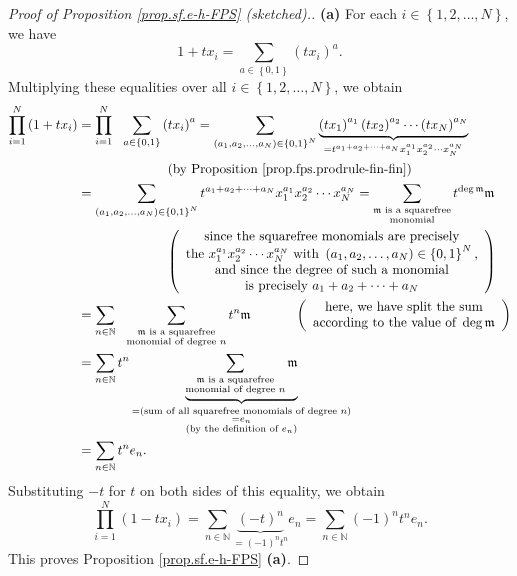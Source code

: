 \begin{proof}
[Proof of Proposition \ref{prop.sf.e-h-FPS} (sketched).]\textbf{(a)} For each
$i\in\left\{  1,2,\ldots,N\right\}  $, we have%
\[
1+tx_{i}=\sum_{a\in\left\{  0,1\right\}  }\left(  tx_{i}\right)  ^{a}.
\]
Multiplying these equalities over all $i\in\left\{  1,2,\ldots,N\right\}  $,
we obtain%
\begin{align*}
\prod_{i=1}^{N}\left(  1+tx_{i}\right)   &  =\prod_{i=1}^{N}\ \ \sum
_{a\in\left\{  0,1\right\}  }\left(  tx_{i}\right)  ^{a}=\sum_{\left(
a_{1},a_{2},\ldots,a_{N}\right)  \in\left\{  0,1\right\}  ^{N}}%
\underbrace{\left(  tx_{1}\right)  ^{a_{1}}\left(  tx_{2}\right)  ^{a_{2}%
}\cdots\left(  tx_{N}\right)  ^{a_{N}}}_{=t^{a_{1}+a_{2}+\cdots+a_{N}}%
x_{1}^{a_{1}}x_{2}^{a_{2}}\cdots x_{N}^{a_{N}}}\\
&  \ \ \ \ \ \ \ \ \ \ \ \ \ \ \ \ \ \ \ \ \left(  \text{by Proposition
\ref{prop.fps.prodrule-fin-fin}}\right) \\
&  =\sum_{\left(  a_{1},a_{2},\ldots,a_{N}\right)  \in\left\{  0,1\right\}
^{N}}t^{a_{1}+a_{2}+\cdots+a_{N}}x_{1}^{a_{1}}x_{2}^{a_{2}}\cdots x_{N}%
^{a_{N}}=\sum_{\substack{\mathfrak{m}\text{ is a squarefree}\\\text{monomial}%
}}t^{\deg\mathfrak{m}}\mathfrak{m}\\
&  \ \ \ \ \ \ \ \ \ \ \ \ \ \ \ \ \ \ \ \ \left(
\begin{array}
[c]{c}%
\text{since the squarefree monomials are precisely}\\
\text{the }x_{1}^{a_{1}}x_{2}^{a_{2}}\cdots x_{N}^{a_{N}}\text{ with }\left(
a_{1},a_{2},\ldots,a_{N}\right)  \in\left\{  0,1\right\}  ^{N}\text{,}\\
\text{and since the degree of such a monomial}\\
\text{is precisely }a_{1}+a_{2}+\cdots+a_{N}%
\end{array}
\right) \\
&  =\sum_{n\in\mathbb{N}}\ \ \sum_{\substack{\mathfrak{m}\text{ is a
squarefree}\\\text{monomial of degree }n}}t^{n}\mathfrak{m}%
\ \ \ \ \ \ \ \ \ \ \left(
\begin{array}
[c]{c}%
\text{here, we have split the sum}\\
\text{according to the value of }\deg\mathfrak{m}%
\end{array}
\right) \\
&  =\sum_{n\in\mathbb{N}}t^{n}\underbrace{\sum_{\substack{\mathfrak{m}\text{
is a squarefree}\\\text{monomial of degree }n}}\mathfrak{m}}%
_{\substack{=\left(  \text{sum of all squarefree monomials of degree
}n\right)  \\=e_{n}\\\text{(by the definition of }e_{n}\text{)}}}\\
&  =\sum_{n\in\mathbb{N}}t^{n}e_{n}.
\end{align*}
Substituting $-t$ for $t$ on both sides of this equality, we obtain%
\[
\prod_{i=1}^{N}\left(  1-tx_{i}\right)  =\sum_{n\in\mathbb{N}}%
\underbrace{\left(  -t\right)  ^{n}}_{=\left(  -1\right)  ^{n}t^{n}}e_{n}%
=\sum_{n\in\mathbb{N}}\left(  -1\right)  ^{n}t^{n}e_{n}.
\]
This proves Proposition \ref{prop.sf.e-h-FPS} \textbf{(a)}. \medskip


\end{proof}
